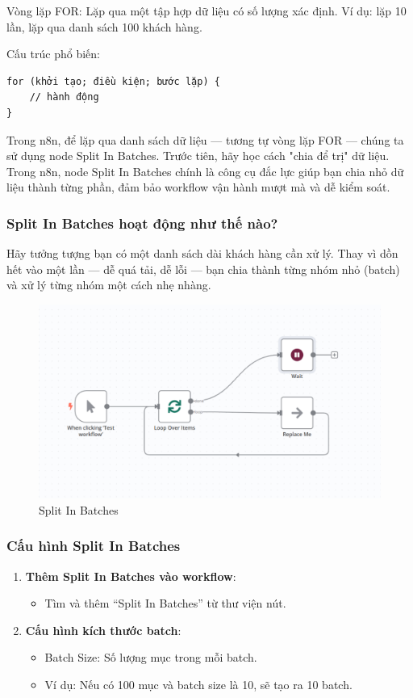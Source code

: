 Vòng lặp FOR: Lặp qua một tập hợp dữ liệu có số lượng xác định.
Ví dụ: lặp 10 lần, lặp qua danh sách 100 khách hàng.

Cấu trúc phổ biến:

\begin{verbatim}
for (khởi tạo; điều kiện; bước lặp) {
    // hành động
}
\end{verbatim}
Trong n8n, để lặp qua danh sách dữ liệu — tương tự vòng lặp FOR — chúng ta sử dụng node Split In Batches. Trước tiên, hãy học cách "chia để trị" dữ liệu. Trong n8n, node Split In Batches chính là công cụ đắc lực giúp bạn chia nhỏ dữ liệu thành từng phần, đảm bảo workflow vận hành mượt mà và dễ kiểm soát.

\subsubsection{Split In Batches hoạt động như thế nào?}

Hãy tưởng tượng bạn có một danh sách dài khách hàng cần xử lý. Thay vì dồn hết vào một lần — dễ quá tải, dễ lỗi — bạn chia thành từng nhóm nhỏ (batch) và xử lý từng nhóm một cách nhẹ nhàng.

\begin{figure}[htbp]
    \centering
    \includegraphics[width=1\linewidth]{Chap1-7/loop.pdf}
    \caption{Split In Batches}
\end{figure}

\subsubsection{Cấu hình Split In Batches}

\begin{enumerate}
  \item \textbf{Thêm Split In Batches vào workflow}:
  \begin{itemize}
    \item Tìm và thêm ``Split In Batches'' từ thư viện nút.
  \end{itemize}

  \item \textbf{Cấu hình kích thước batch}:
  \begin{itemize}
    \item Batch Size: Số lượng mục trong mỗi batch.
    \item Ví dụ: Nếu có 100 mục và batch size là 10, sẽ tạo ra 10 batch.
  \end{itemize}
\end{enumerate}


